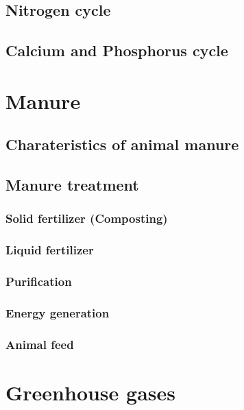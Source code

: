 \documentclass[]{book}
\begin{document}
\section{Nitrogen cycle}\label{nitrogen-cycle}

\section{Calcium and Phosphorus
cycle}\label{calcium-and-phosphorus-cycle}

\chapter{Manure}\label{manure}

\section{Charateristics of animal
manure}\label{charateristics-of-animal-manure}

\section{Manure treatment}\label{manure-treatment}

\subsection{Solid fertilizer
(Composting)}\label{solid-fertilizer-composting}

\subsection{Liquid fertilizer}\label{liquid-fertilizer}

\subsection{Purification}\label{purification}

\subsection{Energy generation}\label{energy-generation}

\subsection{Animal feed}\label{animal-feed}

\chapter{Greenhouse gases}\label{greenhouse-gases}
\end{document}
